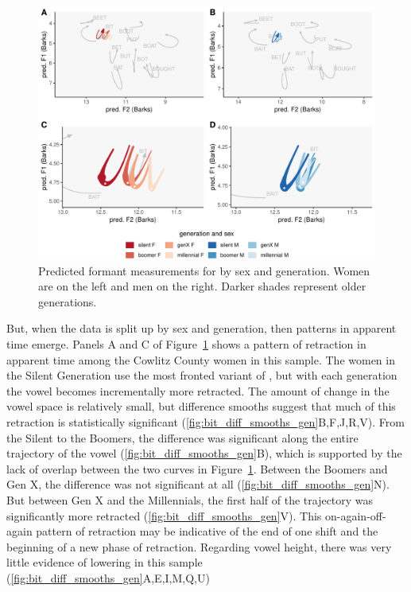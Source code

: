 \begin{figure}[tb!]
	\centering
	\includegraphics[width = 6.5in]{Figures/BIT/BIT_four_panel_plot.pdf}
	\caption[Predicted formant measurements for \bit by sex and generation.]{Predicted formant measurements for \bit by sex and generation. Women are on the left and men on the right. Darker shades represent older generations.}
	\label{fig:BIT_four_panel}
\end{figure}

But, when the data is split up by sex and generation, then patterns in apparent time emerge. Panels A and C of Figure~\ref{fig:BIT_four_panel} shows a pattern of \bit retraction in apparent time among the Cowlitz County women in this sample. The women in the Silent Generation use the most fronted variant of \bit, but with each generation the vowel becomes incrementally more retracted. The amount of change in the vowel space is relatively small, but difference smooths suggest that much of this retraction is statistically significant (\ref{fig:bit_diff_smooths_gen}B,F,J,R,V). From the Silent to the Boomers, the difference was significant along the entire trajectory of the vowel (\ref{fig:bit_diff_smooths_gen}B), which is supported by the lack of overlap between the two curves in Figure~\ref{fig:BIT_four_panel}. Between the Boomers and Gen X, the difference was not significant at all (\ref{fig:bit_diff_smooths_gen}N). But between Gen X and the Millennials, the first half of the trajectory was significantly more retracted (\ref{fig:bit_diff_smooths_gen}V). This on-again-off-again pattern of retraction may be indicative of the end of one shift and the beginning of a new phase of \bit retraction. Regarding vowel height, there was very little evidence of \bit lowering in this sample (\ref{fig:bit_diff_smooths_gen}A,E,I,M,Q,U)

